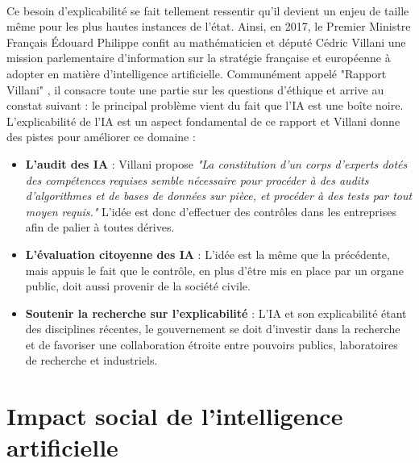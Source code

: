\paragraph{}Ce besoin d'explicabilité se fait tellement ressentir qu'il devient un enjeu de taille même pour les plus hautes instances de l'état. Ainsi, en 2017, le Premier Ministre Français Édouard Philippe confit au mathématicien et député Cédric Villani une mission parlementaire d’information sur la stratégie française et européenne à adopter en matière d'intelligence artificielle. Communément appelé "Rapport Villani" \cite{rapportVillani}, il consacre toute une partie sur les questions d'éthique et arrive au constat suivant : le principal problème vient du fait que l'IA est une boîte noire. L'explicabilité de l'IA est un aspect fondamental de ce rapport et Villani donne des pistes pour améliorer ce domaine :
\begin{itemize}
    \item \textbf{L’audit des IA} : Villani propose \textit{"La constitution d’un corps d’experts dotés des compétences requises semble nécessaire pour procéder à des audits d’algorithmes et de bases de données sur pièce, et procéder à des tests par tout moyen requis."} L'idée est donc d'effectuer des contrôles dans les entreprises afin de palier à toutes dérives.
    \item \textbf{L’évaluation citoyenne des IA} : L'idée est la même que la précédente, mais appuis le fait que le contrôle, en plus d'être mis en place par un organe public, doit aussi provenir de la société civile.
    \item \textbf{Soutenir la recherche sur l’explicabilité} : L'IA et son explicabilité étant des disciplines récentes, le gouvernement se doit d'investir dans la recherche et de favoriser une collaboration étroite entre pouvoirs publics, laboratoires de recherche et industriels.
\end{itemize}

\section{Impact social de l'intelligence artificielle}

